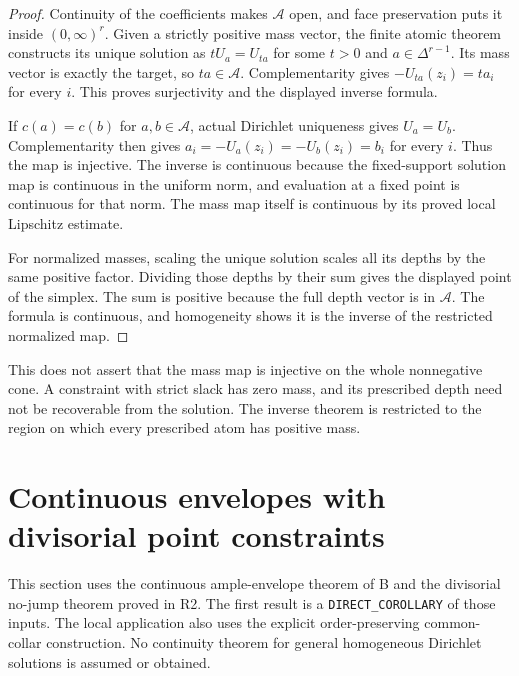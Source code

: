 \documentclass[11pt,a4paper]{article}
\numberwithin{equation}{section}
\theoremstyle{definition}
\theoremstyle{remark}
\begin{document}
\begin{proof}
Continuity of the coefficients makes $\mathcal A$ open, and
face preservation puts it inside $(0,\infty)^r$. Given a
strictly positive mass vector, the finite atomic theorem
constructs its unique solution as $tU_a=U_{ta}$ for some
$t>0$ and $a\in\Delta^{r-1}$. Its mass vector is exactly the
target, so $ta\in\mathcal A$. Complementarity gives
$-U_{ta}(z_i)=ta_i$ for every $i$. This proves surjectivity
and the displayed inverse formula.

If $c(a)=c(b)$ for $a,b\in\mathcal A$, actual Dirichlet
uniqueness gives $U_a=U_b$. Complementarity then gives
$a_i=-U_a(z_i)=-U_b(z_i)=b_i$ for every $i$. Thus the
map is injective. The inverse is continuous because the
fixed-support solution map is continuous in the uniform
norm, and evaluation at a fixed point is continuous for
that norm. The mass map itself is continuous by its proved
local Lipschitz estimate.

For normalized masses, scaling the unique solution scales
all its depths by the same positive factor. Dividing those
depths by their sum gives the displayed point of the simplex.
The sum is positive because the full depth vector is in
$\mathcal A$. The formula is continuous, and homogeneity
shows it is the inverse of the restricted normalized map.
\end{proof}

This does not assert that the mass map is injective on the
whole nonnegative cone. A constraint with strict slack has
zero mass, and its prescribed depth need not be recoverable
from the solution. The inverse theorem is restricted to the
region on which every prescribed atom has positive mass.



\section{Continuous envelopes with divisorial point constraints}
\label{sec:r3-divisorial-obstacle-continuity}

This section uses the continuous ample-envelope theorem of B and the
divisorial no-jump theorem proved in R2. The first result is a
\texttt{DIRECT\_COROLLARY} of those inputs. The local application also
uses the explicit order-preserving common-collar construction. No
continuity theorem for general homogeneous Dirichlet solutions is
assumed or obtained.
\end{document}
